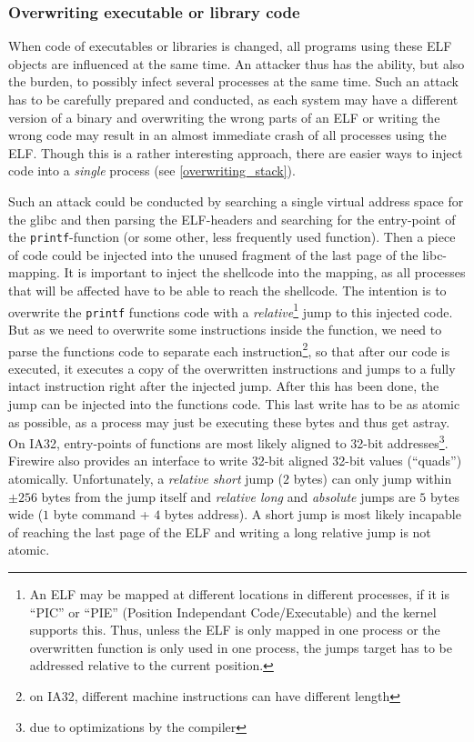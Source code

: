 \subsubsection{Overwriting executable or library code}

When code of executables or libraries is changed, all programs using these ELF
objects are influenced at the same time. An attacker thus has the ability, but
also the burden, to possibly infect several processes at the same time. Such an
attack has to be carefully prepared and conducted, as each system may have a
different version of a binary and overwriting the wrong parts of an ELF or
writing the wrong code may result in an almost immediate crash of all processes
using the ELF. Though this is a rather interesting approach, there are easier
ways to inject code into a \emph{single} process (see \ref{overwriting_stack}).

Such an attack could be conducted by searching a single virtual address space
for the glibc and then parsing the ELF-headers and searching for the entry-point
of the \texttt{printf}-function (or some other, less frequently used function).
Then a piece of code could be injected into the unused fragment of the last page
of the libc-mapping. It is important to inject the shellcode into the mapping,
as all processes that will be affected have to be able to reach the shellcode.
The intention is to overwrite the \texttt{printf} functions code with a
\emph{relative}\footnote{An ELF may be mapped at different locations in
different processes, if it is ``PIC'' or ``PIE'' (Position Independant
Code/Executable) and the kernel supports this.  Thus, unless the ELF is only
mapped in one process or the overwritten function is only used in one process,
the jumps target has to be addressed relative to the current position.} jump to
this injected code.  But as we need to overwrite some instructions inside the
function, we need to parse the functions code to separate each
instruction\footnote{on IA32, different machine instructions can have different
length}, so that after our code is executed, it executes a copy of the
overwritten instructions and jumps to a fully intact instruction right after the
injected jump. After this has been done, the jump can be injected into the
functions code. This last write has to be as atomic as possible, as a process
may just be executing these bytes and thus get astray.  On IA32, entry-points of
functions are most likely aligned to 32-bit addresses\footnote{due to
optimizations by the compiler}.  Firewire also provides an interface to write
32-bit aligned 32-bit values (``quads'') atomically.  Unfortunately, a
\emph{relative short} jump ($2$ bytes) can only jump within $\pm256$ bytes from
the jump itself and \emph{relative long} and \emph{absolute} jumps are $5$ bytes
wide ($1$ byte command + $4$ bytes address).  A short jump is most likely
incapable of reaching the last page of the ELF and writing a long relative jump
is not atomic.

